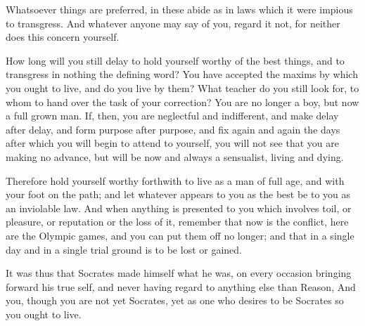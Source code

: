 Whatsoever  things are  preferred, in  these  abide as  in laws  which it  were
impious to transgress. And  whatever anyone may say of you,  regard it not, for
neither does this concern yourself.

How long will you  still delay to hold yourself worthy of  the best things, and
to transgress  in nothing the  defining word? You  have accepted the  maxims by
which you  ought to live, and  do you live by  them? What teacher do  you still
look for, to whom to hand over the task of your correction? You are no longer a
boy, but now  a full grown man.  If, then, you are  neglectful and indifferent,
and make delay after  delay, and form purpose after purpose,  and fix again and
again the days after  which you will begin to attend to  yourself, you will not
see that you  are making no advance,  but will be now and  always a sensualist,
living and dying.

Therefore hold yourself worthy forthwith to live as a man of full age, and with
your foot on the path; and let whatever appears to you as the best be to you as
an inviolable law.  And when anything is presented to  you which involves toil,
or  pleasure, or  reputation  or the  loss  of  it, remember  that  now is  the
conflict, here are the  Olympic games, and you can put them  off no longer; and
that in a single day and in a single trial ground is to be lost or gained.

It was thus that Socrates made himself  what he was, on every occasion bringing
forward his  true self, and never  having regard to anything  else than Reason,
And you, though you are not yet Socrates, yet as one who desires to be Socrates
so you ought to live.
